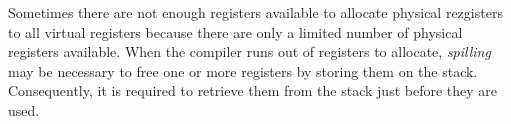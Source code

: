 Sometimes there are not enough registers available to allocate physical rezgisters to all virtual registers because there are only a limited number of physical registers available. When the compiler runs out of registers to allocate, \emph{spilling} may be necessary to free one or more registers by storing them on the stack. Consequently, it is required to retrieve them from the stack just before they are used.




%


